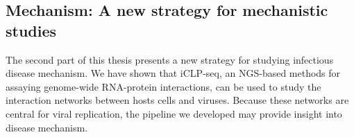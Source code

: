 \subsection{Mechanism: A new strategy for mechanistic studies}

The second part of this thesis presents a new strategy for studying infectious disease mechanism. We have shown that iCLP-seq, an NGS-based methods for assaying genome-wide RNA-protein interactions, can be used to study the interaction networks between hosts cells and viruses. Because these networks are central for viral replication, the pipeline we developed may provide insight into disease mechanism.  
